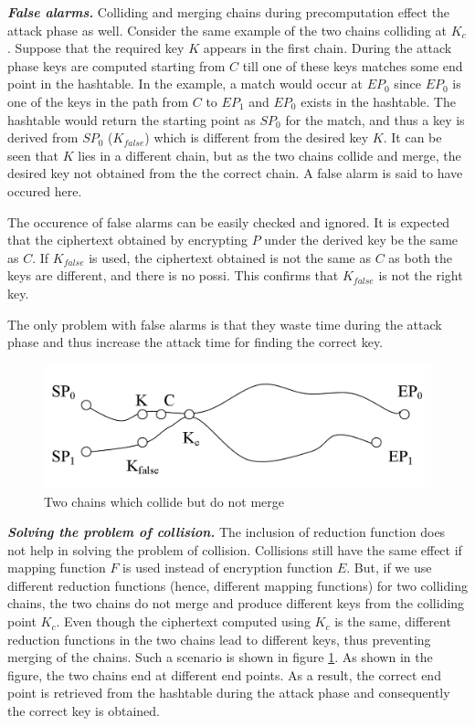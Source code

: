 \noindent  \textit{\textbf{False alarms.}} Colliding and merging chains during precomputation effect the attack phase as well. Consider the same example of the two chains colliding at $K_c$. Suppose that the required key $K$ appears in the first chain. During the attack phase keys are computed starting from $C$ till one of these keys matches some end point in the hashtable. 
In the example, a match would occur at $EP_0$ since $EP_0$ is one of the keys in the path from $C$ to $EP_1$ and $EP_0$ exists in the hashtable. The hashtable would return the starting point as $SP_0$ for the match, and thus a key is derived from $SP_0$ ($K_{false}$) which is different from the desired key $K$. It can be seen that $K$ lies in a different chain, but as the two chains collide and merge, the desired key not obtained from the the correct chain. A false alarm is said to have occured here.

The occurence of false alarms can be easily checked and ignored. It is expected that the ciphertext obtained by encrypting $P$ under the derived key be the same as $C$. If $K_{false}$ is used, the ciphertext obtained is not the same as $C$ as both the keys are different, and there is no possi. This confirms that $K_{false}$ is not the right key. 

The only problem with false alarms is that they waste time during the attack phase and thus increase the attack time for finding the correct key.\\

\begin{figure}[ht!]
	\centering
		\includegraphics[width=4.5in]{./figures/collision-not-merge.PNG}
	\caption{Two chains which collide but do not merge}	
	\label{fig:collision-not-merge}
\end{figure}

\noindent  \textit{\textbf{Solving the problem of collision.}} The inclusion of reduction function does not help in solving the problem of collision. Collisions still have the same effect if mapping function $F$ is used instead of encryption function $E$. But, if we use different reduction functions (hence, different mapping functions) for two colliding chains, the two chains do not merge and produce different keys from the colliding point $K_c$. Even though the ciphertext computed using $K_c$ is the same, different reduction functions in the two chains lead to different keys, thus preventing merging of the chains. Such a scenario is shown in figure \ref{fig:collision-not-merge}. As shown in the figure, the two chains end at different end points. As a result, the correct end point is retrieved from the hashtable during the attack phase and consequently the correct key is obtained. 


